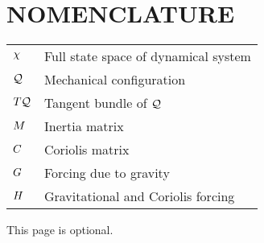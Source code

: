 %
%
%


\chapter*{NOMENCLATURE}

\begin{tabular}{ll}
  $\chi$ & Full state space of dynamical system\\
  $\mathcal{Q}$ & Mechanical configuration\\
  $T\mathcal{Q}$ & Tangent bundle of $\mathcal{Q}$\\
  $M$ & Inertia matrix\\
  $C$ & Coriolis matrix\\
  $G$ & Forcing due to gravity\\
  $H$ & Gravitational and Coriolis forcing
\end{tabular}

\vspace{2em}

This page is optional.

\pagebreak{}
